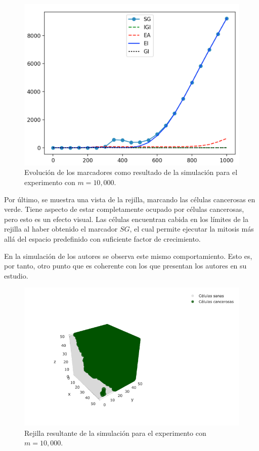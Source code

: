 \begin{figure}[h]
\centering
\includegraphics[scale=0.6]{figures/experiments/exp1/mutations}
\caption{Evolución de los marcadores como resultado de la simulación para el experimento con $m = 10,000$.}
\end{figure}

Por último, se muestra una vista de la rejilla, marcando las células cancerosas en verde. Tiene aspecto de estar completamente
ocupado por células cancerosas, pero esto es un efecto visual. Las células encuentran cabida en los límites de la rejilla
al haber obtenido el marcador $SG$, el cual permite ejecutar la mitosis más allá del espacio predefinido con suficiente
factor de crecimiento.

En la simulación de los autores se observa este mismo comportamiento. Esto es, por tanto, otro punto que es coherente con
los que presentan los autores en su estudio.

\begin{figure}[h]
\centering
\includegraphics[scale=0.6]{figures/experiments/exp1/grid}
\caption{Rejilla resultante de la simulación para el experimento con $m = 10,000$.}
\end{figure}

